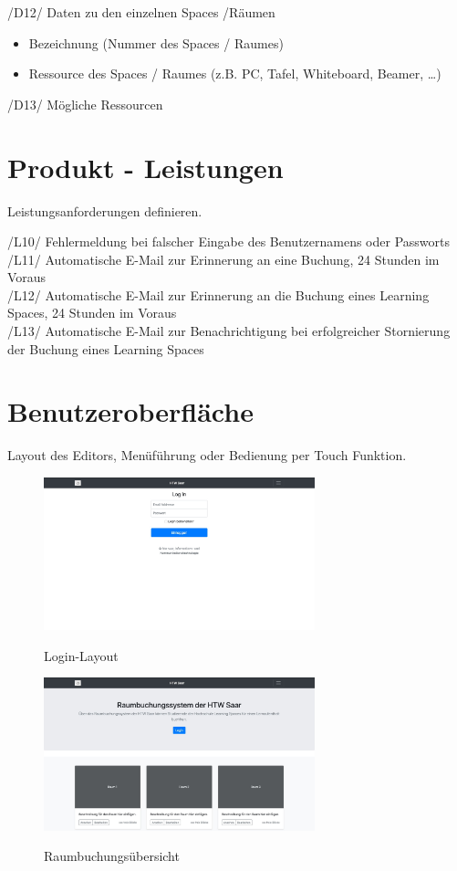 \documentclass[a4paper,report,headsepline]{scrreprt}
\begin{document}
/D12/ Daten zu den einzelnen Spaces /Räumen
\begin{itemize}
\item Bezeichnung (Nummer des Spaces / Raumes)
\item Ressource des Spaces / Raumes (z.B. PC, Tafel, Whiteboard, Beamer, …)
\end{itemize}

/D13/ Mögliche Ressourcen




\chapter{Produkt - Leistungen}\label{produkt-leistungen}

Leistungsanforderungen definieren.


/L10/ Fehlermeldung bei falscher Eingabe des Benutzernamens oder Passworts\\
/L11/ Automatische E-Mail zur Erinnerung an eine Buchung, 24 Stunden im Voraus\\
/L12/ Automatische E-Mail zur Erinnerung an die Buchung eines Learning Spaces, 24 Stunden im Voraus\\
/L13/ Automatische E-Mail zur Benachrichtigung bei erfolgreicher Stornierung der Buchung eines Learning Spaces


\chapter{Benutzeroberfläche}\label{benutzeroberfläche}
Layout des Editors, Menüführung oder Bedienung per Touch Funktion.


\begin{figure}[h]
    \centering
    \caption{Login-Layout}
    \includegraphics[width=0.7\textwidth]{Screenshot-min}
    \label{fig:login-layout}
\end{figure}

\begin{figure}[h]
    \centering
    \caption{Raumbuchungsübersicht}
    \includegraphics[width=0.7\textwidth]{Raumbuchung}
    \label{fig:raumbuchung}
\end{figure}
\end{document}
